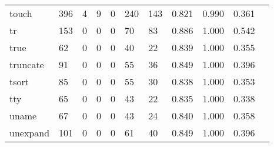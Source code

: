 \begin{longtable}{lp{1.10cm}p{1.10cm}p{1.10cm}p{1.10cm}p{1.10cm}p{1.10cm}p{1.10cm}p{1.10cm}p{1.10cm}p{1.10cm}}
touch     &                    396 &                                  4 &                                 9 &                                0 &                               240 &                             143 &                          0.821 &                                 0.990 &                               0.361 \\
tr        &                    153 &                                  0 &                                 0 &                                0 &                                70 &                              83 &                          0.886 &                                 1.000 &                               0.542 \\
true      &                     62 &                                  0 &                                 0 &                                0 &                                40 &                              22 &                          0.839 &                                 1.000 &                               0.355 \\
truncate  &                     91 &                                  0 &                                 0 &                                0 &                                55 &                              36 &                          0.849 &                                 1.000 &                               0.396 \\
tsort     &                     85 &                                  0 &                                 0 &                                0 &                                55 &                              30 &                          0.838 &                                 1.000 &                               0.353 \\
tty       &                     65 &                                  0 &                                 0 &                                0 &                                43 &                              22 &                          0.835 &                                 1.000 &                               0.338 \\
uname     &                     67 &                                  0 &                                 0 &                                0 &                                43 &                              24 &                          0.840 &                                 1.000 &                               0.358 \\
unexpand  &                    101 &                                  0 &                                 0 &                                0 &                                61 &                              40 &                          0.849 &                                 1.000 &                               0.396 \\

\end{longtable}
